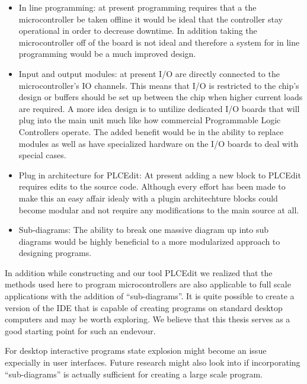 \begin{itemize}
	\item In line programming: at present programming requires that a the microcontroller be taken offline it would be ideal that the controller stay operational in order to decrease downtime. In addition taking the microcontroller off of the board is not ideal and therefore a system for in line programming would be a much improved design.
	\item Input and output modules: at present I/O are directly connected to the microcontroller's IO channels. This means that I/O is restricted to the chip's design or buffers should be set up between the chip when higher current loads are required. A more idea design is to untilize dedicated I/O boards that will plug into the main unit much like how commercial Programmable Logic Controllers operate. The added benefit would be in the ability to replace modules as well as have specialized hardware on the I/O boards to deal with special cases.
	\item Plug in architecture for PLCEdit: At present adding a new block to PLCEdit requires edits to the source code. Although every effort has been made to make this an easy affair idealy with a plugin architechture blocks could become modular and not require any modifications to the main source at all.
	\item Sub-diagrams: The ability to break one massive diagram up into sub diagrams would be highly beneficial to a more modularized approach to designing programs.
\end{itemize}

In addition while constructing \plccharts and our tool PLCEdit we realized that the methods used here to program microcontrollers are also applicable to full scale applications with the addition of ``sub-diagrams''. It is quite possible to create a version of the IDE that is capable of creating programs on standard desktop computers and may be worth exploring. We believe that this thesis serves as a good starting point for such an endevour.

For desktop interactive programs state explosion might become an issue expecially in user interfaces. Future research might also look into if incorporating ``sub-diagrams'' is actually sufficient for creating a large scale program.